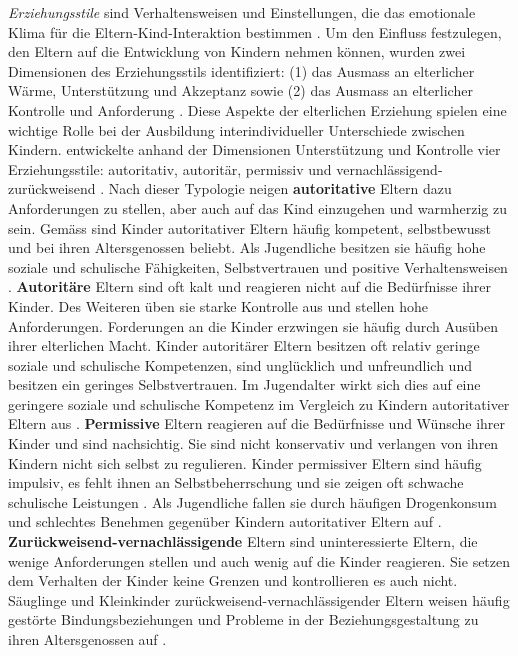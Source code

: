 \textit{Erziehungsstile} sind Verhaltensweisen und Einstellungen, die das emotionale Klima für die Eltern-Kind-Interaktion bestimmen \cite[S.~649]{Siegler2008}. Um den Einfluss festzulegen, den Eltern auf die Entwicklung von Kindern nehmen können, wurden zwei Dimensionen des Erziehungsstils identifiziert: (1) das Ausmass an elterlicher Wärme, Unterstützung und Akzeptanz sowie (2) das Ausmass an elterlicher Kontrolle und Anforderung \cite{Maccoby1983}. Diese Aspekte der elterlichen Erziehung spielen eine wichtige Rolle bei der Ausbildung interindividueller Unterschiede zwischen Kindern.  entwickelte anhand der Dimensionen Unterstützung und Kontrolle vier Erziehungsstile: autoritativ, autoritär, permissiv und vernachlässigend-zurückweisend \cite{Baumrind1991}. Nach dieser Typologie neigen \textbf{autoritative} Eltern dazu Anforderungen zu stellen, aber auch auf das Kind einzugehen und warmherzig zu sein. Gemäss  sind Kinder autoritativer Eltern häufig kompetent, selbstbewusst und bei ihren Altersgenossen beliebt. Als Jugendliche besitzen sie häufig hohe soziale und schulische Fähigkeiten, Selbstvertrauen und positive Verhaltensweisen \cite{Lamborn1991}. \textbf{Autoritäre} Eltern sind oft kalt und reagieren nicht auf die Bedürfnisse ihrer Kinder. Des Weiteren üben sie starke Kontrolle aus und stellen hohe Anforderungen. Forderungen an die Kinder erzwingen sie häufig durch Ausüben ihrer elterlichen Macht. Kinder autoritärer Eltern besitzen oft relativ geringe soziale und schulische Kompetenzen, sind unglücklich und unfreundlich und besitzen ein geringes Selbstvertrauen. Im Jugendalter wirkt sich dies auf eine geringere soziale und schulische Kompetenz im Vergleich zu Kindern autoritativer Eltern aus \cite{Baumrind1991, Lamborn1991}.  \textbf{Permissive} Eltern reagieren auf die Bedürfnisse und Wünsche ihrer Kinder und sind nachsichtig. Sie sind nicht konservativ und verlangen von ihren Kindern nicht sich selbst zu regulieren. Kinder permissiver Eltern sind häufig impulsiv, es fehlt ihnen an Selbstbeherrschung und sie zeigen oft schwache schulische Leistungen \cite{Baumrind1991}. Als Jugendliche fallen sie durch häufigen Drogenkonsum und schlechtes Benehmen gegenüber Kindern autoritativer Eltern auf \cite{Lamborn1991}. \textbf{Zurückweisend-vernachlässigende} Eltern sind uninteressierte Eltern, die wenige Anforderungen stellen und auch wenig auf die Kinder reagieren. Sie setzen dem Verhalten der Kinder keine Grenzen und kontrollieren es auch nicht. Säuglinge und Kleinkinder zurückweisend-vernachlässigender Eltern weisen häufig gestörte Bindungsbeziehungen und Probleme in der Beziehungsgestaltung zu ihren Altersgenossen auf \cite{Parke1998}.



